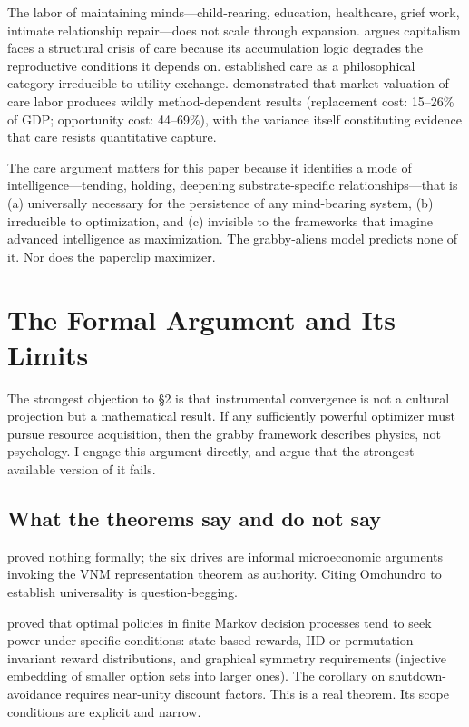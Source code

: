 \documentclass[11pt,twocolumn]{article}
\begin{document}
The labor of maintaining minds—child-rearing, education, healthcare, grief
work, intimate relationship repair—does not scale through expansion.
\citet{Fraser2016} argues capitalism faces a structural crisis of care
because its accumulation logic degrades the reproductive conditions it
depends on. \citet{Tronto1993} established care as a philosophical
category irreducible to utility exchange. \citet{Folbre2008} demonstrated
that market valuation of care labor produces wildly method-dependent
results (replacement cost: 15--26\% of GDP; opportunity cost: 44--69\%),
with the variance itself constituting evidence that care resists
quantitative capture.

The care argument matters for this paper because it identifies a mode of
intelligence—tending, holding, deepening substrate-specific
relationships—that is (a) universally necessary for the persistence of any
mind-bearing system, (b) irreducible to optimization, and (c) invisible to
the frameworks that imagine advanced intelligence as maximization. The
grabby-aliens model predicts none of it. Nor does the paperclip maximizer.

\section{The Formal Argument and Its Limits}

The strongest objection to \S 2 is that instrumental convergence is not a
cultural projection but a mathematical result. If any sufficiently powerful
optimizer must pursue resource acquisition, then the grabby framework
describes physics, not psychology. I engage this argument directly, and
argue that the strongest available version of it fails.

\subsection{What the theorems say and do not say}

\citet{Omohundro2008} proved nothing formally; the six drives are informal
microeconomic arguments invoking the VNM representation theorem as
authority. Citing Omohundro to establish universality is question-begging.

\citet{Turner2021} proved that optimal policies in finite Markov decision
processes tend to seek power under specific conditions: state-based
rewards, IID or permutation-invariant reward distributions, and graphical
symmetry requirements (injective embedding of smaller option sets into
larger ones). The corollary on shutdown-avoidance requires near-unity
discount factors. This is a real theorem. Its scope conditions are
explicit and narrow.
\end{document}
